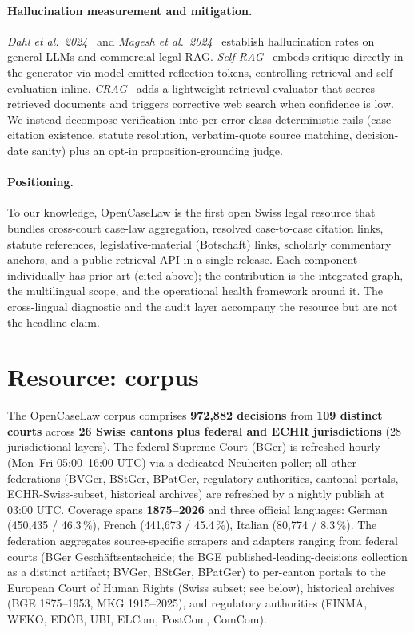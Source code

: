 \documentclass[11pt,a4paper]{article}
\begin{document}
\paragraph{Hallucination measurement and mitigation.} \emph{Dahl et al.\ 2024}~\cite{dahl2024} and \emph{Magesh et al.\ 2024}~\cite{magesh2024} establish hallucination rates on general LLMs and commercial legal-RAG. \emph{Self-RAG}~\cite{asai2023} embeds critique directly in the generator via model-emitted reflection tokens, controlling retrieval and self-evaluation inline. \emph{CRAG}~\cite{yan2024} adds a lightweight retrieval evaluator that scores retrieved documents and triggers corrective web search when confidence is low. We instead decompose verification into per-error-class deterministic rails (case-citation existence, statute resolution, verbatim-quote source matching, decision-date sanity) plus an opt-in proposition-grounding judge.

\paragraph{Positioning.} To our knowledge, OpenCaseLaw is the first open Swiss legal resource that bundles cross-court case-law aggregation, resolved case-to-case citation links, statute references, legislative-material (Botschaft) links, scholarly commentary anchors, and a public retrieval API in a single release. Each component individually has prior art (cited above); the contribution is the integrated graph, the multilingual scope, and the operational health framework around it. The cross-lingual diagnostic and the audit layer accompany the resource but are not the headline claim.

\section{Resource: corpus}\label{sec:corpus}



The OpenCaseLaw corpus comprises \textbf{972{,}882 decisions} from \textbf{109 distinct courts} across \textbf{26 Swiss cantons plus federal and ECHR jurisdictions} (28 jurisdictional layers). The federal Supreme Court (BGer) is refreshed hourly (Mon--Fri 05:00--16:00 UTC) via a dedicated Neuheiten poller; all other federations (BVGer, BStGer, BPatGer, regulatory authorities, cantonal portals, ECHR-Swiss-subset, historical archives) are refreshed by a nightly publish at 03:00 UTC. Coverage spans \textbf{1875--2026} and three official languages: German (450{,}435 / 46.3\,\%), French (441{,}673 / 45.4\,\%), Italian (80{,}774 / 8.3\,\%). The federation aggregates source-specific scrapers and adapters ranging from federal courts (BGer Geschäftsentscheide; the BGE published-leading-decisions collection as a distinct artifact; BVGer, BStGer, BPatGer) to per-canton portals to the European Court of Human Rights (Swiss subset; see below), historical archives (BGE 1875--1953, MKG 1915--2025), and regulatory authorities (FINMA, WEKO, ED\"OB, UBI, ELCom, PostCom, ComCom).
\end{document}
